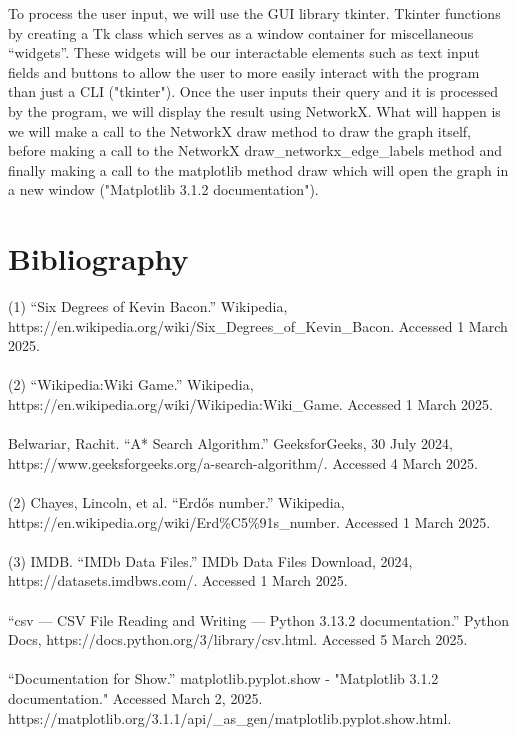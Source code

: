\documentclass{article}
\begin{document}
To process the user input, we will use the GUI library tkinter. Tkinter functions by creating a Tk class which serves as a window container for miscellaneous “widgets”. These widgets will be our interactable elements such as text input fields and buttons to allow the user to more easily interact with the program than just a CLI ("tkinter"). Once the user inputs their query and it is processed by the program, we will display the result using NetworkX. What will happen is we will make a call to the NetworkX draw method to draw the graph itself, before making a call to the NetworkX draw\_networkx\_edge\_labels method and finally making a call to the matplotlib method draw which will open the graph in a new window ("Matplotlib 3.1.2 documentation").

\section{Bibliography}

(1) “Six Degrees of Kevin Bacon.” Wikipedia, https://en.wikipedia.org/wiki/Six\_Degrees\_of\_Kevin\_Bacon. Accessed 1 March 2025.\\\\

(2) “Wikipedia:Wiki Game.” Wikipedia, https://en.wikipedia.org/wiki/Wikipedia:Wiki\_Game. Accessed 1 March 2025.\\\\

Belwariar, Rachit. “A* Search Algorithm.” GeeksforGeeks, 30 July 2024, https://www.geeksforgeeks.org/a-search-algorithm/. Accessed 4 March 2025.\\\\

(2) Chayes, Lincoln, et al. “Erdős number.” Wikipedia, https://en.wikipedia.org/wiki/Erd\%C5\%91s\_number. Accessed 1 March 2025.\\\\

(3) IMDB. “IMDb Data Files.” IMDb Data Files Download, 2024, https://datasets.imdbws.com/. Accessed 1 March 2025.\\\\

“csv — CSV File Reading and Writing — Python 3.13.2 documentation.” Python Docs, https://docs.python.org/3/library/csv.html. Accessed 5 March 2025.\\\\


“Documentation for Show.” matplotlib.pyplot.show - "Matplotlib 3.1.2 documentation." Accessed March 2, 2025. https://matplotlib.org/3.1.1/api/\_as\_gen/matplotlib.pyplot.show.html.\\\\
\end{document}
